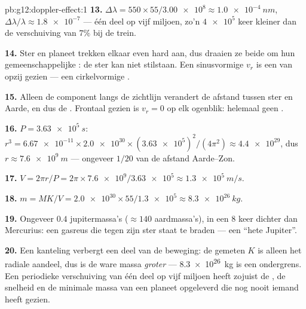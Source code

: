 \begin{solution}{pb:g12:doppler-effect:1}
\textbf{13.} $\Delta\lambda = 550 \times 55/\num{3.00e8} \approx
\qty{1.0e-4}{nm}$, $\Delta\lambda/\lambda \approx \num{1.8e-7}$ --- één
deel op vijf miljoen, zo'n $\num{4e5}$ keer kleiner dan de verschuiving
van $7\%$ bij de trein.

\textbf{14.} Ster en planeet trekken elkaar even hard aan, dus draaien ze
beide om hun gemeenschappelijke : de ster kan niet
stilstaan. Een sinusvormige $v_r$ is een  van
opzij gezien --- een cirkelvormige .

\textbf{15.} Alleen de component langs de zichtlijn verandert de afstand
tussen ster en Aarde, en dus de . Frontaal gezien is
$v_r = 0$ op elk ogenblik: helemaal geen .

\textbf{16.} $P = \qty{3.63e5}{s}$: $r^3 = \num{6.67e-11} \times
\num{2.0e30} \times (\num{3.63e5})^2/(4\pi^2) \approx \num{4.4e29}$, dus
$r \approx \qty{7.6e9}{m}$ --- ongeveer $1/20$ van de afstand
Aarde--Zon.

\textbf{17.} $V = 2\pi r/P = 2\pi \times \num{7.6e9}/\num{3.63e5} \approx
\qty{1.3e5}{m/s}$.

\textbf{18.} $m = M K/V = \num{2.0e30} \times 55/\num{1.3e5} \approx
\qty{8.3e26}{kg}$.

\textbf{19.} Ongeveer $0.4$ jupitermassa's ($\approx 140$ aardmassa's),
in een  $8$ keer dichter dan Mercurius: een gasreus die tegen zijn
ster staat te braden --- een ``hete Jupiter''.

\textbf{20.} Een kanteling verbergt een deel van de beweging: de gemeten
$K$ is alleen het radiale aandeel, dus is de ware massa \emph{groter} ---
\qty{8.3e26}{kg} is een ondergrens. Een periodieke verschuiving van één
deel op vijf miljoen heeft zojuist de , de snelheid en de minimale
massa van een planeet opgeleverd die nog nooit iemand heeft gezien.
\end{solution}
